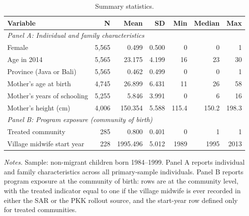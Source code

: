 \begin{table}[!htbp]
\centering
\caption{Summary statistics.}\label{tab:descriptives}
\begin{tabular}{lrrrrrr}
\toprule
Variable & N & Mean & SD & Min & Median & Max \\
\midrule
\multicolumn{7}{l}{\emph{Panel A: Individual and family characteristics}} \\
Female & 5,565 & 0.499 & 0.500 & 0 & 0 & 1 \\
Age in 2014 & 5,565 & 23.175 & 4.199 & 16 & 23 & 30 \\
Province (Java or Bali) & 5,565 & 0.462 & 0.499 & 0 & 0 & 1 \\
Mother's age at birth & 4,745 & 26.899 & 6.431 & 11 & 26 & 58 \\
Mother's years of schooling & 5,255 & 5.846 & 3.991 & 0 & 6 & 16 \\
Mother's height (cm) & 4,006 & 150.354 & 5.588 & 115.4 & 150.2 & 198.3 \\
\midrule
\multicolumn{7}{l}{\emph{Panel B: Program exposure (community of birth)}} \\
Treated community & 285 & 0.800 & 0.401 & 0 & 1 & 1 \\
Village midwife start year & 228 & 1995.496 & 5.012 & 1989 & 1995 & 2013 \\
\bottomrule
\end{tabular}
\begin{minipage}{0.9\textwidth}
\footnotesize
\emph{Notes.} Sample: non-migrant children born 1984--1999. Panel A reports individual and family characteristics across all primary-sample individuals. Panel B reports program exposure at the community of birth: rows are at the community level, with the treated indicator equal to one if the village midwife is ever recorded in either the SAR or the PKK rollout source, and the start-year row defined only for treated communities.
\end{minipage}
\end{table}
